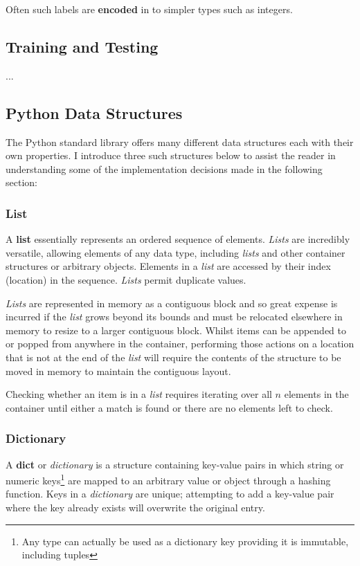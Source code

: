 Often such labels are \textbf{encoded} in to simpler types such as integers.


\subsection{Training and Testing}

...

\subsection{Python Data Structures}
\label{sec:python-structures}

The Python standard library offers many different data structures each with
their own properties. I introduce three such structures below to assist the
reader in understanding some of the implementation decisions made in the
following section:

\subsubsection{List}
A \textbf{list}\citep{py-list} essentially represents an ordered sequence of
elements. \textit{Lists} are incredibly versatile, allowing elements of any data
type, including \textit{lists} and other container structures or arbitrary
objects. Elements in a \textit{list} are accessed by their index (location)
in the sequence. \textit{Lists} permit duplicate values.

\textit{Lists} are represented in memory as a contiguous block and so great
expense is incurred if the \textit{list} grows beyond its bounds and must be
relocated elsewhere in memory to resize to a larger contiguous block.
Whilst items can be appended to or popped from anywhere in the container,
performing those actions on a location that is not at the end of the
\textit{list} will require the contents of the structure to be moved in memory
to maintain the contiguous layout.

Checking whether an item is in a \textit{list} requires iterating over all $n$
elements in the container until either a match is found or there are no elements
left to check.


\subsubsection{Dictionary}

A \textbf{dict}\citep{py-dict} or \textit{dictionary} is a structure containing
key-value pairs in which string or numeric keys\footnote{Any type can actually
be used as a dictionary key providing it is immutable, including
tuples\citep{py-dict}} are mapped to an arbitrary value or object through a
hashing function. Keys in a \textit{dictionary} are unique; attempting to add a
key-value pair where the key already exists will overwrite the original entry.

